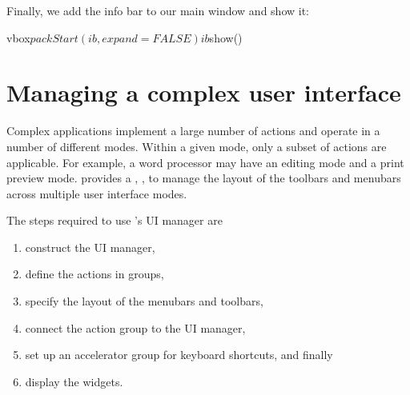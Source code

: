 Finally, we add the info bar to our main window and show it:
\begin{Schunk}
\begin{Sinput}
 vbox$packStart(ib, expand = FALSE)
 ib$show()
\end{Sinput}
\end{Schunk}

\section{Managing a complex user interface}
\label{sec:RGtk2:UIManager}

Complex applications implement a large number of actions and operate
in a number of different modes. Within a given mode, only a subset of
actions are applicable. For example, a word processor may have an
editing mode and a print preview mode. \GTK\/ provides a , , to manage the layout of
the toolbars and menubars across multiple user interface modes.

The steps required to use \GTK's UI manager are
\begin{enumerate}
\item construct the UI manager,
\item define the actions in groups,
\item specify the layout of the menubars and toolbars,
\item connect the action group to the UI manager, 
\item set up an accelerator group for keyboard shortcuts, and finally
\item display the widgets.
\end{enumerate}

